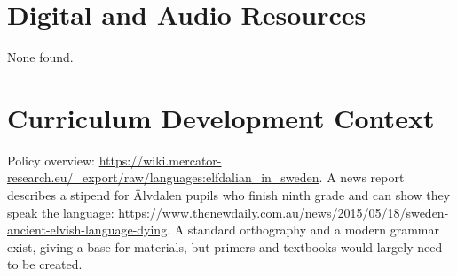 \documentclass[12pt]{article}
\begin{document}
\section{Digital and Audio Resources}
None found.

\section{Curriculum Development Context}
Policy overview: \url{https://wiki.mercator-research.eu/_export/raw/languages:elfdalian_in_sweden}. A news report describes a stipend for \"Alvdalen pupils who finish ninth grade and can show they speak the language: \url{https://www.thenewdaily.com.au/news/2015/05/18/sweden-ancient-elvish-language-dying}. A standard orthography and a modern grammar exist, giving a base for materials, but primers and textbooks would largely need to be created.
\end{document}
